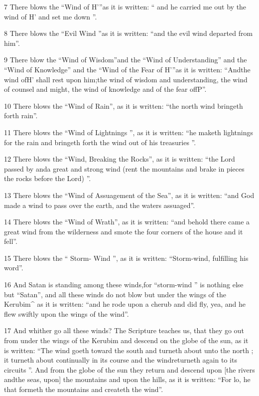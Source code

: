 \par 7 There blows the “Wind of H'”as it is written: “ and he carried me out by the wind of H' and set me down ”. 

\par 8 There blows the “Evil Wind ”as it is written: “and the evil wind departed from him”. 

\par 9 There blow the “Wind of Wisdom”and the “Wind of Understanding” and the “Wind of Knowledge” and the “Wind of the Fear of H'”as it is written: “Andthe wind ofH' shall rest upon him;the wind of wisdom and understanding, the wind of counsel and might, the wind of knowledge and of the fear offP”. 

\par 10 There blows the “Wind of Rain”, as it is written: “the north wind bringeth forth rain”. 

\par 11 There blows the “Wind of Lightnings ”, as it is written: “he maketh lightnings for the rain and bringeth forth the wind out of his treasuries ”. 

\par 12 There blows the “Wind, Breaking the Rocks”, as it is written: “the Lord passed by anda great and strong wind (rent the mountains and brake in pieces the rocks before the Lord) ”.

\par 13 There blows the “Wind of Assuagement of the Sea”, as it is written: “and God made a wind to pass over the earth, and the waters assuaged”. 

\par 14 There blows the “Wind of Wrath”, as it is written: “and behold there came a great wind from the wilderness and smote the four corners of the house and it fell”.

\par 15 There blows the “ Storm- Wind ”, as it is written: “Storm-wind, fulfilling his word”. 

\par 16 And Satan is standing among these winds,for “storm-wind ” is nothing else but “Satan”, and all these winds do not blow but under the wings of the Kerubim^ as it is written: “and he rode upon a cherub and did fly, yea, and he flew swiftly upon the wings of the wind”. 

\par 17 And whither go all these winds? The Scripture teaches us, that they go out from under the wings of the Kerubim and descend on the globe of the sun, as it is written: “The wind goeth toward the south and turneth about unto the north ; it turneth about continually in its course and the windreturneth again to its circuits ”. And from the globe of the sun they return and descend upon [the rivers andthe seas, upon] the mountains and upon the hills, as it is written: “For lo, he that formeth the mountains and createth the wind”. 


